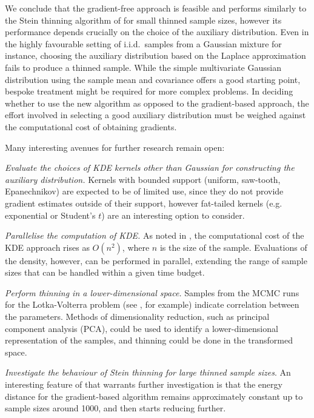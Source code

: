\documentclass[11pt,a4paper]{report}
\begin{document}
We conclude that the gradient-free approach is feasible and performs similarly to the Stein thinning algorithm of \cite{riabizOptimalThinningMCMC2022} for small thinned sample sizes, however its performance depends crucially on the choice of the auxiliary distribution. Even in the highly favourable setting of i.i.d.\ samples from a Gaussian mixture for instance, choosing the auxiliary distribution based on the Laplace approximation fails to produce a thinned sample. While the simple multivariate Gaussian distribution using the sample mean and covariance offers a good starting point, bespoke treatment might be required for more complex problems. In deciding whether to use the new algorithm as opposed to the gradient-based approach, the effort involved in selecting a good auxiliary distribution must be weighed against the computational cost of obtaining gradients.

Many interesting avenues for further research remain open:

\textit{Evaluate the choices of KDE kernels other than Gaussian for constructing the auxiliary distribution.} Kernels with bounded support (uniform, saw-tooth, Epanechnikov) are expected to be of limited use, since they do not provide gradient estimates outside of their support, however fat-tailed kernels (e.g. exponential or Student's $t$) are an interesting option to consider.

\textit{Parallelise the computation of KDE.} As noted in , the computational cost of the KDE approach rises as $O(n^2)$, where $n$ is the size of the sample. Evaluations of the density, however, can be performed in parallel, extending the range of sample sizes that can be handled within a given time budget.

\textit{Perform thinning in a lower-dimensional space.} Samples from the MCMC runs for the Lotka-Volterra problem (see , for example) indicate correlation between the parameters. Methods of dimensionality reduction, such as principal component analysis (PCA), could be used to identify a lower-dimensional representation of the samples, and thinning could be done in the transformed space.

\textit{Investigate the behaviour of Stein thinning for large thinned sample sizes}. An interesting feature of  that warrants further investigation is that the energy distance for the gradient-based algorithm remains approximately constant up to sample sizes around 1000, and then starts reducing further.
\end{document}
